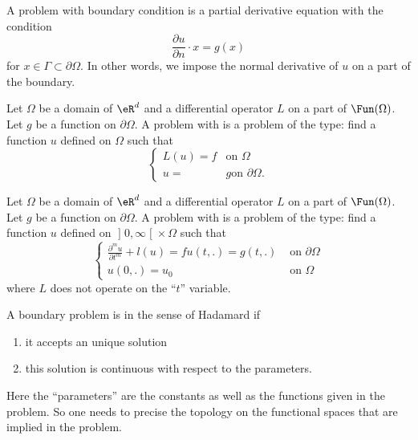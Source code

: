 \begin{definition}
    A problem with  boundary condition is a partial derivative equation with the condition
    \begin{equation}
        \frac{ \partial u }{ \partial n }\cdot x=g(x)
    \end{equation}
    for \( x\in\Gamma\subset\partial\Omega\). In other words, we impose the normal derivative of \( u\) on a part of the boundary.
\end{definition}

\begin{definition}
    Let \( \Omega\) be a domain of \( \eR^d\) and a differential operator \( L\) on a part of \( \Fun(\Omega)\). Let \( g\) be a function on \( \partial \Omega\). A problem with  is a problem of the type: find a function \( u\) defined on \( \Omega\) such that
    \begin{equation}
        \begin{cases}
            L(u)=f    &   \text{on } \Omega\\
            u =   & g   \text{on }\partial\Omega.
        \end{cases}
    \end{equation}
\end{definition}

\begin{definition}
Let \( \Omega\) be a domain of \( \eR^d\) and a differential operator \( L\) on a part of \( \Fun(\Omega)\). Let \( g\) be a function on \( \partial \Omega\). A problem with  is a problem of the type: find a function \( u\) defined on \( \mathopen] 0 , \infty \mathclose[\times \Omega\) such that
    \begin{equation}
        \begin{cases}
            \frac{ \partial^mu }{ \partial t^m }+l(u)=f
            u(t,.)=g(t,.)&\text{ on }\partial\Omega\\
            u(0,.)=u_0&\text{ on }\Omega
        \end{cases}
    \end{equation}
    where \( L\) does not operate on the ``\( t\)'' variable.
\end{definition}

\begin{definition}
    A boundary problem is  in the sense of Hadamard if
    \begin{enumerate}
        \item
            it accepts an unique solution
        \item
            this solution is continuous with respect to the parameters.
    \end{enumerate}
    Here the ``parameters'' are the constants as well as the functions given in the problem. So one needs to precise the topology on the functional spaces that are implied in the problem.
\end{definition}

